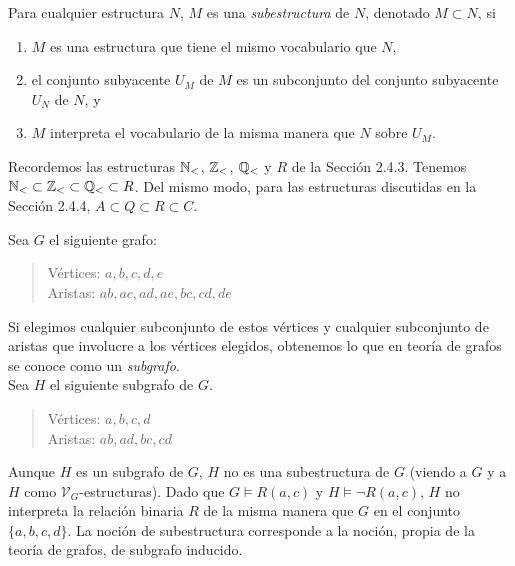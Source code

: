 \documentclass[12pt,a4paper]{book}
\newcommand{\VV}{\mathcal{V}}
\begin{document}
    \begin{definicion}[Subestructura]\label{def:subestructura}
        Para cualquier estructura $N$, $M$ es una \textit{subestructura} de $N$, denotado $M\subset N$, si
        \begin{enumerate}
            \item[1.] $M$ es una estructura que tiene el mismo vocabulario que $N$,
            \item[2.] el conjunto subyacente $U_{M}$ de $M$ es un subconjunto del conjunto subyacente $U_{N}$ de $N$, y
            \item[3.] $M$ interpreta el vocabulario de la misma manera que $N$ sobre $U_{M}$.
        \end{enumerate}
    \end{definicion}

    \begin{ejemplo}
        Recordemos las estructuras $\mathbb{N}_{<}$, $\mathbb{Z}_{<}$, $\mathbb{Q}_{<}$ y $R$ de la Sección 2.4.3. Tenemos
        $\mathbb{N}_{<}\subset\mathbb{Z}_{<}\subset\mathbb{Q}_{<}\subset R$. Del mismo modo, para las estructuras discutidas en la Sección 2.4.4,
        $A\subset Q\subset R\subset C$.
    \end{ejemplo}

    \begin{ejemplo}\label{ej:subgrafo-no-subestructura}
        Sea $G$ el siguiente grafo:

        \begin{quote}
            Vértices: $a,b,c,d,e$\\
            Aristas: $ab,ac,ad,ae,bc,cd,de$
        \end{quote}

        Si elegimos cualquier subconjunto de estos vértices y cualquier subconjunto de aristas que involucre a los vértices
        elegidos, obtenemos lo que en teoría de grafos se conoce como un \textit{subgrafo}.\\
        Sea $H$ el siguiente subgrafo de $G$.

        \begin{quote}
            Vértices: $a,b,c,d$\\
            Aristas: $ab,ad,bc,cd$
        \end{quote}

        Aunque $H$ es un subgrafo de $G$, $H$ no es una subestructura de $G$ (viendo a $G$ y a $H$ como
        $\VV_{G}$-estructuras). Dado que $G\models R(a,c)$ y $H\models\neg R(a,c)$, $H$ no interpreta la relación binaria
        $R$ de la misma manera que $G$ en el conjunto $\{a,b,c,d\}$. La noción de subestructura corresponde a la noción,
        propia de la teoría de grafos, de subgrafo inducido.
    \end{ejemplo}
\end{document}
